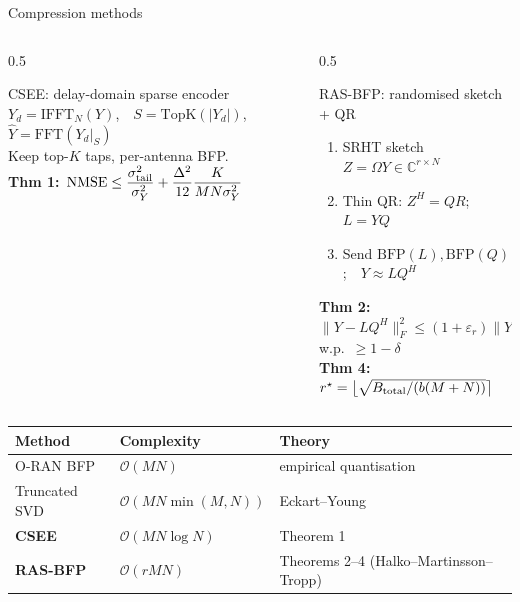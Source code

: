 \documentclass[aspectratio=169,11pt,xcolor=table]{beamer}
\begin{document}
\begin{frame}{Compression methods}
  \small
  \begin{columns}[T]
    \begin{column}{0.5\textwidth}
      \begin{block}{CSEE: delay-domain sparse encoder}
        $Y_d = \mathrm{IFFT}_N(Y)$,\ \ $S = \mathrm{TopK}(|Y_d|)$,\ \ $\hat Y = \mathrm{FFT}(Y_d|_S)$\\[2pt]
        Keep top-$K$ taps, per-antenna BFP.\\[2pt]
        \textbf{Thm 1:}\
          $\mathrm{NMSE} \le \dfrac{\sigma^2_{\rm tail}}{\sigma^2_Y} + \dfrac{\Delta^2}{12}\dfrac{K}{MN\sigma_Y^2}$
      \end{block}
    \end{column}
    \begin{column}{0.5\textwidth}
      \begin{block}{RAS-BFP: randomised sketch + QR}
        \begin{enumerate}
          \item SRHT sketch $Z = \Omega Y \in \mathbb{C}^{r\times N}$
          \item Thin QR: $Z^H = QR$;\ \ $L = YQ$
          \item Send $\mathrm{BFP}(L), \mathrm{BFP}(Q)$;\ \ $Y \approx L Q^H$
        \end{enumerate}
        \textbf{Thm 2:} $\|Y - LQ^H\|_F^2 \le (1+\varepsilon_r)\|Y - Y_r\|_F^2$ w.p.\ $\ge 1-\delta$\\
        \textbf{Thm 4:} $r^\star = \big\lfloor\sqrt{B_{\rm total}/(b(M+N))}\big\rceil$
      \end{block}
    \end{column}
  \end{columns}
  \vspace{0.1em}
  \centering
  \begin{tabular}{lll}
    \toprule
    Method & Complexity & Theory \\
    \midrule
    O-RAN BFP & $\mathcal{O}(MN)$ & empirical quantisation \\
    Truncated SVD & $\mathcal{O}(MN\min(M,N))$ & Eckart--Young \\
    \textbf{CSEE} & $\mathcal{O}(MN\log N)$ & Theorem 1 \\
    \textbf{RAS-BFP} & $\mathcal{O}(rMN)$ & Theorems 2--4 (Halko--Martinsson--Tropp) \\
    \bottomrule
  \end{tabular}
\end{frame}
\end{document}
